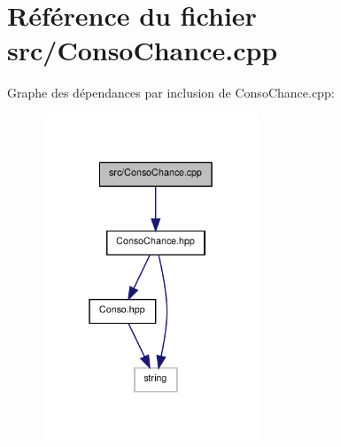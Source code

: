 \section{Référence du fichier src/\-Conso\-Chance.cpp}
\label{_conso_chance_8cpp}
Graphe des dépendances par inclusion de Conso\-Chance.\-cpp\-:\nopagebreak
\begin{figure}[H]
\begin{center}
\leavevmode
\includegraphics[width=183pt]{_conso_chance_8cpp__incl}
\end{center}
\end{figure}
